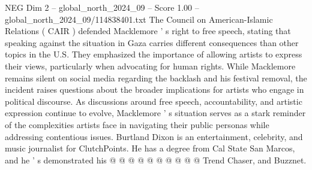 \begin{textsample}{NEG Dim 2 – global\_north\_2024\_09 – Score 1.00 – global\_north\_2024\_09/114838401.txt}
The Council on American-Islamic Relations ( CAIR ) defended Macklemore ' s right to free speech, stating that speaking against the situation in Gaza carries different consequences than other topics in the U.S.
They emphasized the importance of allowing artists to express their views, particularly when advocating for human rights.
While Macklemore remains silent on social media regarding the backlash and his festival removal, the incident raises questions about the broader implications for artists who engage in political discourse.
As discussions around free speech, accountability, and artistic expression continue to evolve, Macklemore ' s situation serves as a stark reminder of the complexities artists face in navigating their public personas while addressing contentious issues.
Burtland Dixon is an entertainment, celebrity, and music journalist for ClutchPoints.
He has a degree from Cal State San Marcos, and he ' s demonstrated his @ @ @ @ @ @ @ @ @ @ Trend Chaser, and Buzznet.

\end{textsample}
